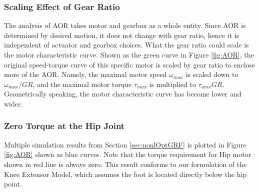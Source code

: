  \subsubsection{Scaling Effect of Gear Ratio}
 \label{sec:GR_scale_effect}
 
 The analysis of AOR takes motor and gearbox as a whole entity. Since AOR is determined by desired motion, it does not change with gear ratio, hence it is independent of actuator and gearbox choices. What the gear ratio could scale is the motor characteristic curve. Shown as the green curve in Figure \ref{fig:AOR}, the original speed-torque curve of this specific motor is scaled by gear ratio to enclose more of the AOR. Namely, the maximal motor speed $\omega_{max}$ is scaled down to $\omega_{max}/GR$, and the maximal motor torque $\tau_{max}$ is multiplied to $\tau_{amx}GR$. Geometrically speaking, the motor characteristic curve has become lower and wider. 
 
 \subsubsection{Zero Torque at the Hip Joint}
 
 Multiple simulation results from Section \ref{sec:nonlOptGRF} is plotted in Figure \ref{fig:AOR} shown as blue curves. Note that the torque requirement for Hip motor shown in red line is always zero. This result conforms to our formulation of the Knee Extensor Model, which assumes the foot is located directly below the hip point.
 
 
 
 

